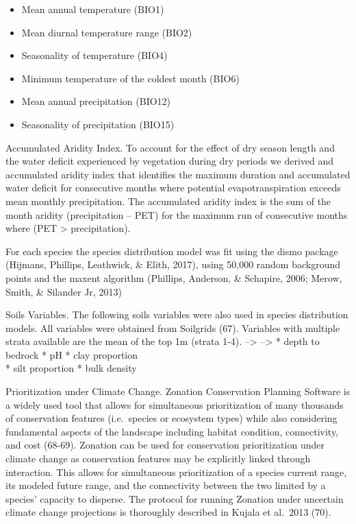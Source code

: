\documentclass[]{article}
\providecommand{\tightlist}{%
  \setlength{\itemsep}{0pt}\setlength{\parskip}{0pt}}
\begin{document}
\begin{itemize}
\tightlist
\item
  Mean annual temperature (BIO1)
\item
  Mean diurnal temperature range (BIO2)
\item
  Seasonality of temperature (BIO4)
\item
  Minimum temperature of the coldest month (BIO6)
\item
  Mean annual precipitation (BIO12)
\item
  Seasonality of precipitation (BIO15)
\end{itemize}

Accumulated Aridity Index. To account for the effect of dry season length and the water deficit experienced by vegetation during dry periods we derived and accumulated aridity index that identifies the maximum duration and accumulated water deficit for consecutive months where potential evapotranspiration exceeds mean monthly precipitation. The accumulated aridity index is the sum of the month aridity (precipitation -- PET) for the maximum run of consecutive months where (PET \textgreater{} precipitation).

For each species the species distribution model was fit using the dismo package (Hijmans, Phillips, Leathwick, \& Elith, 2017), using 50,000 random background points and the maxent algorithm (Phillips, Anderson, \& Schapire, 2006; Merow, Smith, \& Silander Jr, 2013)

Soils Variables. The following soils variables were also used in species distribution models. All variables were obtained from Soilgrids (67). Variables with multiple strata available are the mean of the top 1m (strata 1-4). --\textgreater{} --\textgreater{}
* depth to bedrock
* pH
* clay proportion\\
* silt proportion
* bulk density

Prioritization under Climate Change. Zonation Conservation Planning Software is a widely used tool that allows for simultaneous prioritization of many thousands of conservation features (i.e.~species or ecosystem types) while also considering fundamental aspects of the landscape including habitat condition, connectivity, and cost (68-69). Zonation can be used for conservation prioritization under climate change as conservation features may be explicitly linked through interaction. This allows for simultaneous prioritization of a species current range, its modeled future range, and the connectivity between the two limited by a species' capacity to disperse. The protocol for running Zonation under uncertain climate change projections is thoroughly described in Kujala et al.~2013 (70).
\end{document}
